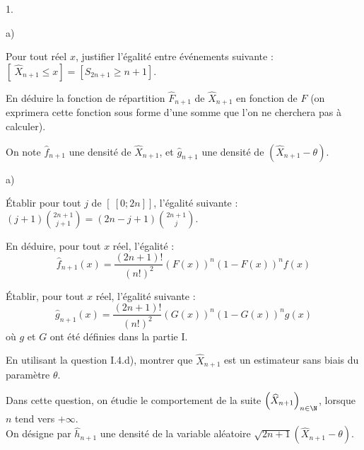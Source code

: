 \documentclass[11pt]{article}%
\begin{document}
\begin{noliste}{1.}
 \setlength{\itemsep}{4mm}
\item 
\begin{noliste}{a)}
 \setlength{\itemsep}{2mm}
\item Pour tout réel $x$, justifier l'égalité entre événements suivante
: $\left[ \ \widehat{X}_{n + 1}\leq x\right] = \left[
S_{2n + 1}\geq n + 1\right] $.

\item En déduire la fonction de répartition $\widehat{F}_{n + 1}$ de
$\widehat{X}_{n + 1}$ en fonction de $F$ (on exprimera cette fonction
sous
forme d'une somme que l'on ne cherchera pas à calculer).
\end{noliste}

\item On note $\widehat{f}_{n + 1}$ une densité de $\widehat{X}_{n +
1}$, et 
$\widehat{g}_{n + 1}$ une densité de $\left( \widehat{X}_{n + 1}-\theta
\right) $.

\begin{noliste}{a)}
 \setlength{\itemsep}{2mm}
\item Établir pour tout $j$ de $\left[ \ \left[ 0;2n\right] \right] $,
l'égalité suivante : $\left( j + 1\right) \binom{2n + 1}{j + 1} =
\left(
2n-j + 1\right) \binom{2n + 1}{j}$.

\item En déduire, pour tout $x$ réel, l'égalité :
\[
\widehat{f}_{n + 1}\left( x\right) = \frac{\left( 2n + 1\right)
!}{\left(
n!\right) ^{2}}\left( F\left( x\right) \right) ^{n}\left( 1-F\left(
x\right)
\right) ^{n}f\left( x\right)
\]

\item Établir, pour tout $x$ réel, l'égalité suivante :
\[
\widehat{g}_{n + 1}\left( x\right) = \frac{\left( 2n + 1\right)
!}{\left(
n!\right) ^{2}}\left( G\left( x\right) \right) ^{n}\left( 1-G\left(
x\right)
\right) ^{n}g\left( x\right)
\]
où $g$ et $G$ ont été définies dans la partie I.

\item En utilisant la question I.4.d), montrer que $\widehat{X}_{n +
1}$ est
un estimateur sans biais du paramètre $\theta $.
\end{noliste}

\item Dans cette question, on étudie le comportement de la suite
$\left( 
\widehat{X}_{n + 1}\right)_{n\in \N}$, lorsque $n$ tend vers $ + \infty

$.\\
On désigne par $\widehat{h}_{n + 1}$ une densité de la variable
aléatoire $\sqrt{2n + 1}\left( \widehat{X}_{n + 1}-\theta \right) $.


\end{noliste}
\end{document}
